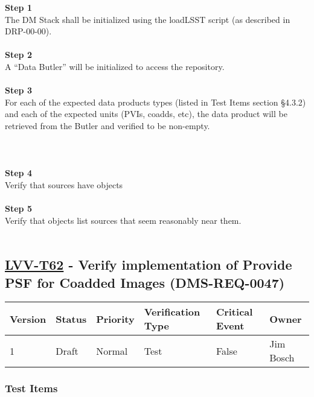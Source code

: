 \textbf{Step 1}\\
The DM Stack shall be initialized using the loadLSST script (as
described in DRP-00-00).\\
~\\
\textbf{Step 2}\\
A ``Data Butler'' will be initialized to access the repository.\\
~\\
\textbf{Step 3}\\
For each of the expected data products types (listed in Test Items
section §4.3.2) and each of the expected units (PVIs, coadds, etc), the
data product will be retrieved from the Butler and verified to be
non-empty.\\
~\\
~\\
~\\
\textbf{Step 4}\\
Verify that sources have objects\\
~\\
\textbf{Step 5}\\
Verify that objects list sources that seem reasonably near them.\\
~\\

\hypertarget{lvv-t62---verify-implementation-of-provide-psf-for-coadded-images-dms-req-0047}{%
\subsection{\texorpdfstring{\href{https://jira.lsstcorp.org/secure/Tests.jspa\#/testCase/LVV-T62}{LVV-T62}
- Verify implementation of Provide PSF for Coadded Images
(DMS-REQ-0047)}{LVV-T62 - Verify implementation of Provide PSF for Coadded Images (DMS-REQ-0047)}}\label{lvv-t62---verify-implementation-of-provide-psf-for-coadded-images-dms-req-0047}}

\begin{longtable}[]{@{}llllll@{}}
\toprule
Version & Status & Priority & Verification Type & Critical Event &
Owner\tabularnewline
\midrule
\endhead
1 & Draft & Normal & Test & False & Jim Bosch\tabularnewline
\bottomrule
\end{longtable}

\hypertarget{test-items-38}{%
\subsubsection{Test Items}\label{test-items-38}}

